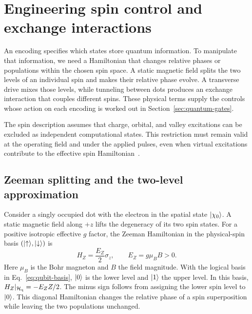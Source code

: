 \section{Engineering spin control and exchange interactions}
\label{sec:spin-control-exchange}

An encoding specifies which states store quantum information.
To manipulate that information, we need a Hamiltonian that changes
relative phases or populations within the chosen spin space.
A static magnetic field splits the two levels of an individual
spin and makes their relative phase evolve. A transverse drive
mixes those levels, while tunneling between dots produces an
exchange interaction that couples different spins. These physical
terms supply the controls whose action on each encoding is worked
out in Section~\ref{sec:quantum-gates}.

The spin description assumes that charge, orbital, and valley
excitations can be excluded as independent computational states.
This restriction must remain valid at the operating field and
under the applied pulses, even when virtual excitations contribute
to the effective spin Hamiltonian~\cite{Burkard2023}.

\subsection{Zeeman splitting and the two-level approximation}
\label{sec:platform-encoding}

Consider a singly occupied dot with the electron in the spatial
state $\lvert \chi_0\rangle$. A static magnetic field along $+z$ lifts the
degeneracy of its two spin states. For a positive isotropic
effective $g$ factor, the Zeeman Hamiltonian in the physical-spin
basis $(\lvert \uparrow\rangle,\lvert \downarrow\rangle)$ is
\begin{equation}
  H_Z=\frac{E_Z}{2}\sigma_z,
  \qquad E_Z=g\mu_B B>0.
  \label{eq:zeeman}
\end{equation}
Here $\mu_B$ is the Bohr magneton and $B$ the field magnitude.
With the logical basis in Eq.~\eqref{eq:qubit-basis},
$\lvert 0\rangle$ is the lower level and $\lvert 1\rangle$ the upper level.
In this basis, $H_Z|_{\mathcal{H}_{\mathrm q}}=-E_ZZ/2$.
The minus sign follows from assigning the lower spin level to
$\lvert 0\rangle$. This diagonal Hamiltonian changes the relative phase of
a spin superposition while leaving the two populations unchanged.

